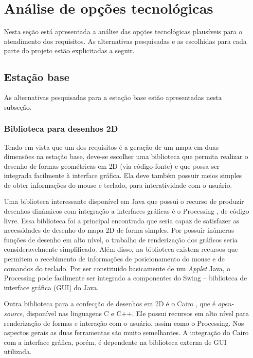 \section{Análise de opções tecnológicas}

Nesta seção está apresentada a análise das opções tecnológicas plausíveis para o atendimento dos requisitos. As alternativas pesquisadas e as escolhidas para cada parte do projeto estão explicitadas a seguir.

\subsection{Estação base}

As alternativas pesquisadas para a estação base estão apresentadas nesta subseção.

\subsubsection{Biblioteca para desenhos 2D}
\label{subsec:alternativas_desenho}

Tendo em vista que um dos requisitos é a geração de um mapa em duas dimensões na estação base, deve-se escolher uma biblioteca que permita realizar o desenho de formas geométricas em 2D (via código-fonte) e que possa ser integrada facilmente à interface gráfica. Ela deve também possuir meios simples de obter informações do mouse e teclado, para interatividade com o usuário. 

Uma biblioteca interessante disponível em Java que possui o recurso de produzir desenhos dinâmicos com integração a interfaces gráficas é o Processing \cite{processing}, de código livre. Essa biblioteca foi a principal encontrada que seria capaz de satisfazer as necessidades de desenho do mapa 2D de forma simples. Por possuir inúmeras funções de desenho em alto nível, o trabalho de renderização dos gráficos seria consideravelmente simplificado. Além disso, na biblioteca existem recursos que permitem o recebimento de informações de posicionamento do mouse e de comandos do teclado. Por ser constituído basicamente de um \textit{Applet} Java, o Processing pode facilmente ser integrado a componentes do Swing -- biblioteca de interface gráfica (GUI) do Java.


Outra biblioteca para a confecção de desenhos em 2D é o Cairo \cite{cairo}, que é \textit{open-source}, disponível nas linguagens C e C++. Ele possui recursos em alto nível para renderização de formas e interação com o usuário, assim como o Processing. Nos aspectos gerais as duas ferramentas são muito semelhantes. A integração do Cairo com a interface gráfica, porém, é dependente na biblioteca externa de GUI utilizada.

